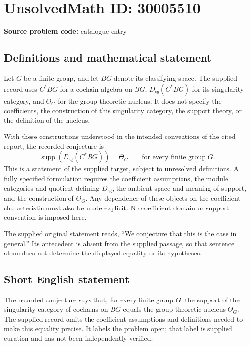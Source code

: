 \documentclass[11pt]{article}
\begin{document}
\section*{UnsolvedMath ID: 30005510}
\textbf{Source problem code:} catalogue entry
\subsection{Definitions and mathematical statement}
Let \(G\) be a finite group, and let \(BG\) denote its classifying space. The supplied record uses \(C^*BG\) for a cochain algebra on \(BG\), \(D_{\mathrm{sg}}(C^*BG)\) for its singularity category, and \(\Theta_G\) for the group-theoretic nucleus. It does not specify the coefficients, the construction of this singularity category, the support theory, or the definition of the nucleus.

With these constructions understood in the intended conventions of the cited report, the recorded conjecture is
\[
\operatorname{supp}\!\left(D_{\mathrm{sg}}(C^*BG)\right)=\Theta_G
\qquad\text{for every finite group }G.
\]
This is a statement of the supplied target, subject to unresolved definitions. A fully specified formulation requires the coefficient assumptions, the module categories and quotient defining \(D_{\mathrm{sg}}\), the ambient space and meaning of support, and the construction of \(\Theta_G\). Any dependence of these objects on the coefficient characteristic must also be made explicit. No coefficient domain or support convention is imposed here.

The supplied original statement reads, ``We conjecture that this is the case in general.'' Its antecedent is absent from the supplied passage, so that sentence alone does not determine the displayed equality or its hypotheses.
\subsection{Short English statement}
The recorded conjecture says that, for every finite group \(G\), the support of the singularity category of cochains on \(BG\) equals the group-theoretic nucleus \(\Theta_G\). The supplied record omits the coefficient assumptions and definitions needed to make this equality precise. It labels the problem open; that label is supplied curation and has not been independently verified.
\end{document}
